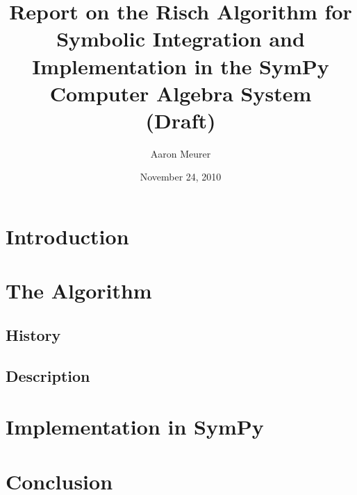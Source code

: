\documentclass[12pt,titlepage]{article}
\newcommand{\SymPy}{Sym\-Py}
\begin{document}
\title{Report on the Risch Algorithm for Symbolic
Integration and Implementation in the Sym\-Py Computer Algebra System \\(Draft)}
\author{Aaron Meurer}
\date{November 24, 2010}
\maketitle
%
\begin{abstract}

\end{abstract}

\tableofcontents
\listoffigures
\listoftables

\section{Introduction}


\section{The Algorithm}
\subsection{History}


\subsection{Description}


\section{Implementation in \SymPy}


\section{Conclusion}


\appendix

\glsaddall
\printglossary

\nocite{*}


\end{document}
